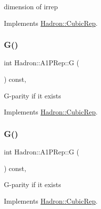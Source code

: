 dimension of irrep 

Implements \mbox{\hyperlink{structHadron_1_1CubicRep_ac178d14064f037a66af4b9fb4b312d51}{Hadron\+::\+Cubic\+Rep}}.

\mbox{\label{structHadron_1_1A1PRep_ab530e4430b28d16940ad3c922b253c70}} 
\subsubsection{\texorpdfstring{G()}{G()}\hspace{0.1cm}{\footnotesize\ttfamily [1/2]}}
{\footnotesize\ttfamily int Hadron\+::\+A1\+P\+Rep\+::G (\begin{DoxyParamCaption}{ }\end{DoxyParamCaption}) const\hspace{0.3cm}{\ttfamily [inline]}, {\ttfamily [virtual]}}

G-\/parity if it exists 

Implements \mbox{\hyperlink{structHadron_1_1CubicRep_a52104e43266d1614c00bbd1c3b395458}{Hadron\+::\+Cubic\+Rep}}.

\mbox{\label{structHadron_1_1A1PRep_ab530e4430b28d16940ad3c922b253c70}} 
\subsubsection{\texorpdfstring{G()}{G()}\hspace{0.1cm}{\footnotesize\ttfamily [2/2]}}
{\footnotesize\ttfamily int Hadron\+::\+A1\+P\+Rep\+::G (\begin{DoxyParamCaption}{ }\end{DoxyParamCaption}) const\hspace{0.3cm}{\ttfamily [inline]}, {\ttfamily [virtual]}}

G-\/parity if it exists 

Implements \mbox{\hyperlink{structHadron_1_1CubicRep_a52104e43266d1614c00bbd1c3b395458}{Hadron\+::\+Cubic\+Rep}}.

\mbox{\label{structHadron_1_1A1PRep_a62ee0e58d7e0763955b3c738cbcfdd4d}} 
